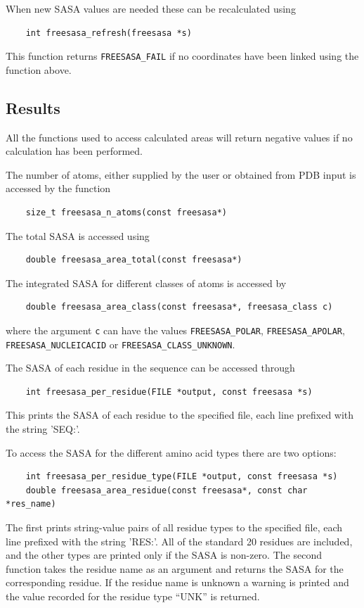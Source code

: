 \documentclass[a4paper,11pt]{article}
\begin{document}
When new SASA values are needed these can be recalculated using
\begin{verbatim} 
    int freesasa_refresh(freesasa *s)
\end{verbatim}
This function returns \verb|FREESASA_FAIL| if no coordinates have
been linked using the function above.

\subsection{Results}

All the functions used to access calculated areas will return negative
values if no calculation has been performed.

The number of atoms, either supplied by the user or obtained from PDB input
is accessed by the function
\begin{verbatim}
    size_t freesasa_n_atoms(const freesasa*)
\end{verbatim}
The total SASA is accessed using
\begin{verbatim}
    double freesasa_area_total(const freesasa*)
\end{verbatim}
The integrated SASA for different classes of atoms is accessed by
\begin{verbatim}
    double freesasa_area_class(const freesasa*, freesasa_class c)
\end{verbatim}
where the argument \verb|c| can have the values \verb|FREESASA_POLAR|, 
\verb|FREESASA_APOLAR|, \verb|FREESASA_NUCLEICACID| or 
\verb|FREESASA_CLASS_UNKNOWN|.

The SASA of each residue in the sequence can be accessed through
\begin{verbatim}
    int freesasa_per_residue(FILE *output, const freesasa *s)
\end{verbatim}
This prints the SASA of each residue to the specified file, each
line prefixed with the string 'SEQ:'.

To access the SASA for the different amino acid types there are two
options:
\begin{verbatim}
    int freesasa_per_residue_type(FILE *output, const freesasa *s)
    double freesasa_area_residue(const freesasa*, const char *res_name)
\end{verbatim}
The first prints string-value pairs of all residue types to the
specified file, each line prefixed with the string 'RES:'. All of the
standard 20 residues are included, and the other types are printed
only if the SASA is non-zero.  The second function takes the residue
name as an argument and returns the SASA for the corresponding
residue. If the residue name is unknown a warning is printed and the
value recorded for the residue type ``UNK'' is returned.
\end{document}
